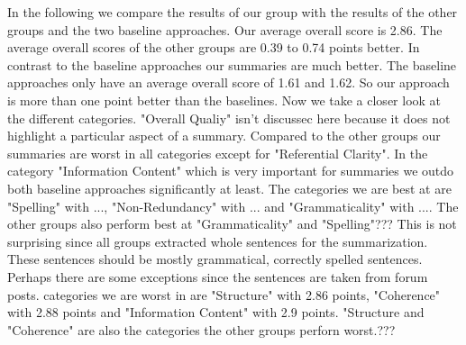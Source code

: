 In the following we compare the results of our group with the results of the other groups and the two baseline approaches. Our average overall score is 2.86. The average overall scores of the other groups are 0.39 to 0.74 points better. In contrast to the baseline approaches our summaries are much better. The baseline approaches only have an average overall score of 1.61 and 1.62. So our approach is more than one point better than the baselines. Now we take a closer look at the different categories. "Overall Qualiy" isn't discussec here because it does not highlight a particular aspect of a summary. Compared to the other groups our summaries are worst in all categories except for "Referential Clarity". In the category "Information Content" which is very important for summaries we outdo both baseline approaches significantly at least. The categories we are best at are "Spelling" with ..., "Non-Redundancy" with ... and "Grammaticality" with .... The other groups also perform best at "Grammaticality" and "Spelling"??? This is not surprising since all groups extracted whole sentences for the summarization. These sentences should be mostly grammatical, correctly spelled sentences. Perhaps there are some exceptions since the sentences are taken from forum posts. categories we are worst in are "Structure" with 2.86 points, "Coherence" with 2.88 points and "Information Content" with 2.9 points. "Structure and "Coherence" are also the categories the other groups perforn worst.???
